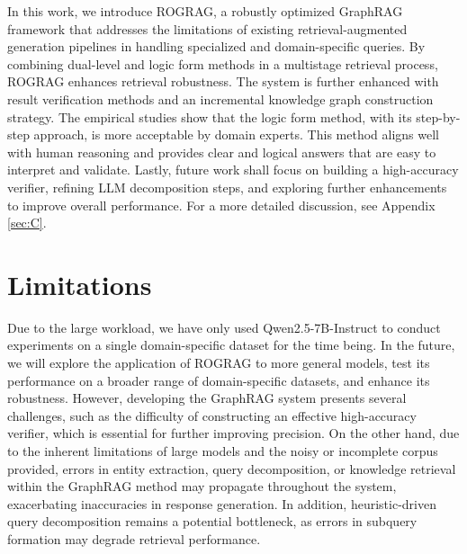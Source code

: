 \documentclass[11pt]{article}
\begin{document}
In this work, we introduce ROGRAG, a robustly optimized GraphRAG framework that addresses the limitations of existing retrieval-augmented generation pipelines in handling specialized and domain-specific queries. By combining dual-level and logic form methods in a multistage retrieval process, ROGRAG enhances retrieval robustness. The system is further enhanced with result verification methods and an incremental knowledge graph construction strategy. The empirical studies show that the logic form method, with its step-by-step approach, is more acceptable by domain experts. This method aligns well with human reasoning and provides clear and logical answers that are easy to interpret and validate. Lastly, future work shall focus on building a high-accuracy verifier, refining LLM decomposition steps, and exploring further enhancements to improve overall performance. For a more detailed discussion, see Appendix \ref{sec:C}.

\section*{Limitations}
Due to the large workload, we have only used Qwen2.5-7B-Instruct to conduct experiments on a single domain-specific dataset for the time being. In the future, we will explore the application of ROGRAG to more general models, test its performance on a broader range of domain-specific datasets, and enhance its robustness. However, developing the GraphRAG system presents several challenges, such as the difficulty of constructing an effective high-accuracy verifier, which is essential for further improving precision. On the other hand, due to the inherent limitations of large models and the noisy or incomplete corpus provided, errors in entity extraction, query decomposition, or knowledge retrieval within the GraphRAG method may propagate throughout the system, exacerbating inaccuracies in response generation. In addition, heuristic-driven query decomposition remains a potential bottleneck, as errors in subquery formation may degrade retrieval performance.
\end{document}
